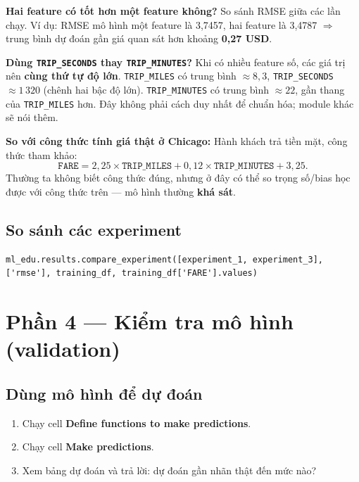 \documentclass[12pt,a4paper]{article}
\begin{document}
\begin{vidu}[title={Đáp án tham khảo}]
\textbf{Hai feature có tốt hơn một feature không?}
So sánh RMSE giữa các lần chạy.
Ví dụ: RMSE mô hình một feature là 3{,}7457, hai feature là 3{,}4787 $\Rightarrow$ trung bình dự đoán gần giá quan sát hơn khoảng \textbf{0{,}27 USD}.

\medskip
\textbf{Dùng \texttt{TRIP\_SECONDS} thay \texttt{TRIP\_MINUTES}?}
Khi có nhiều feature số, các giá trị nên \textbf{cùng thứ tự độ lớn}.
\texttt{TRIP\_MILES} có trung bình $\approx 8{,}3$, \texttt{TRIP\_SECONDS} $\approx 1\,320$ (chênh hai bậc độ lớn).
\texttt{TRIP\_MINUTES} có trung bình $\approx 22$, gần thang của \texttt{TRIP\_MILES} hơn.
Đây không phải cách duy nhất để chuẩn hóa; module khác sẽ nói thêm.

\medskip
\textbf{So với công thức tính giá thật ở Chicago:}
Hành khách trả tiền mặt, công thức tham khảo:
\[
  \texttt{FARE} = 2{,}25 \times \texttt{TRIP\_MILES} + 0{,}12 \times \texttt{TRIP\_MINUTES} + 3{,}25.
\]
Thường ta không biết công thức đúng, nhưng ở đây có thể so trọng số/bias học được với công thức trên --- mô hình thường \textbf{khá sát}.
\end{vidu}

\subsection{So sánh các experiment}

\begin{lstlisting}
ml_edu.results.compare_experiment([experiment_1, experiment_3], ['rmse'], training_df, training_df['FARE'].values)
\end{lstlisting}

\newpage

\section{Phần 4 --- Kiểm tra mô hình (validation)}

\subsection{Dùng mô hình để dự đoán}

\begin{phuongphap}[title={Hướng dẫn}]
\begin{enumerate}
  \item Chạy cell \textbf{Define functions to make predictions}.
  \item Chạy cell \textbf{Make predictions}.
  \item Xem bảng dự đoán và trả lời: dự đoán gần nhãn thật đến mức nào?
\end{enumerate}
\end{phuongphap}
\end{document}
